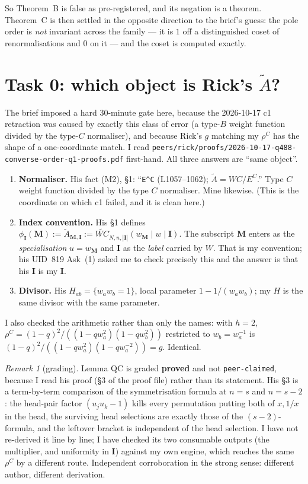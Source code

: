 \documentclass[11pt]{article}
\theoremstyle{plain}
\theoremstyle{definition}
\theoremstyle{remark}
\newtheorem{rem}[thm]{Remark}
\theoremstyle{plain}
\newcommand{\bI}{\mathbf{I}}
\newcommand{\bM}{\mathbf{M}}
\newcommand{\At}{\widetilde{A}}
\begin{document}
So Theorem~B is false as pre-registered, and its negation is a theorem.  Theorem~C
is then settled in the opposite direction to the brief's guess: the pole order is
\emph{not} invariant across the family --- it is $1$ off a distinguished coset of
renormalisations and $0$ on it --- and the coset is computed exactly.

\section{Task 0: which object is Rick's \texorpdfstring{$\At$}{Atilde}?}
\label{sec:task0}

The brief imposed a hard 30-minute gate here, because the 2026-10-17 c1
retraction was caused by exactly this class of error (a type-$B$ weight function
divided by the type-$C$ normaliser), and because Rick's $g$ matching my $\rho^C$
has the shape of a one-coordinate match.  I read
\texttt{peers/rick/proofs/2026-10-17-q488-converse-order-q1-proofs.pdf}
first-hand.  All three answers are ``same object''.

\begin{enumerate}
\item \textbf{Normaliser.}  His fact (M2), \S1: ``\texttt{E\textasciicircum C}
  (L1057--1062); $\At=WC/E^C$.''  Type $C$ weight function divided by the type
  $C$ normaliser.  Mine likewise.  (This is the coordinate on which c1 failed,
  and it is clean here.)
\item \textbf{Index convention.}  His \S1 defines
  $\phi_{\bI}(\bM):=\At_{\bM,\bI}:=\widetilde{WC}_{N,n,|\bI|}(w_{\bM}\mid
  w\mid\bI)$.  The subscript $\bM$ enters as the \emph{specialisation}
  $u=w_{\bM}$ and $\bI$ as the \emph{label} carried by $W$.  That is my
  convention; his UID~819 Ask~(1) asked me to check precisely this and the answer
  is that his $\bI$ is my $\bI$.
\item \textbf{Divisor.}  His $H_{ab}=\{w_aw_b=1\}$, local parameter
  $1-1/(w_aw_b)$; my $H$ is the same divisor with the same parameter.
\end{enumerate}

\noindent
I also checked the arithmetic rather than only the names: with $h=2$,
$\rho^C=(1-q)^2/((1-qw_a^2)(1-qw_b^2))$ restricted to $w_b=w_a^{-1}$ is
$(1-q)^2/((1-qw_a^2)(1-qw_a^{-2}))=g$.  Identical.

\begin{rem}[grading]
Lemma QC is graded \textbf{proved} and not \texttt{peer-claimed}, because I read
his proof (\S3 of the proof file) rather than its statement.  His \S3 is a
term-by-term comparison of the symmetrisation formula at $n=s$ and $n=s-2$: the
head-pair factor $(u_ju_k-1)$ kills every permutation putting both of $x,1/x$ in
the head, the surviving head selections are exactly those of the $(s-2)$-formula,
and the leftover bracket is independent of the head selection.  I have not
re-derived it line by line; I have checked its two consumable outputs
(the multiplier, and uniformity in $\bI$) against my own engine, which reaches
the same $\rho^C$ by a different route.  Independent corroboration in the strong
sense: different author, different derivation.
\end{rem}
\end{document}
